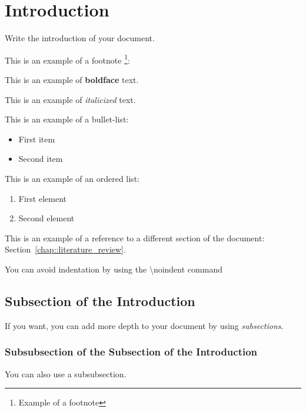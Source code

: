 \chapter{Introduction}
\label{chap::introduction}

Write the introduction of your document.

This is an example of a footnote \footnote{Example of a footnote}:

This is an example of \textbf{boldface} text.

This is an example of \textit{italicized} text.

This is an example of a bullet-list:
\begin{itemize}
    \item First item
    \item Second item
\end{itemize}

This is an example of an ordered list:
\begin{enumerate}
    \item First element
    \item Second element
\end{enumerate}

This is an example of a reference to a different section of the document: Section~\ref{chap::literature_review}.

\noindent You can avoid indentation by using the \textbackslash noindent command

\section{Subsection of the Introduction}
\label{subsec::subsectionoftheintroduction}
If you want, you can add more depth to your document by using \textit{subsections}.

\subsection{Subsubsection of the Subsection of the Introduction}
\label{subsubsec::subsubsectionofthesubsectionoftheintroduction}
You can also use a subsubsection.